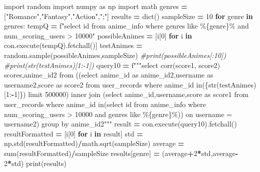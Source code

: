 \documentclass[
]{article}
\newenvironment{Shaded}{\begin{snugshade}}{\end{snugshade}}
\newcommand{\BuiltInTok}[1]{#1}
\newcommand{\CommentTok}[1]{\textcolor[rgb]{0.56,0.35,0.01}{\textit{#1}}}
\newcommand{\ControlFlowTok}[1]{\textcolor[rgb]{0.13,0.29,0.53}{\textbf{#1}}}
\newcommand{\DecValTok}[1]{\textcolor[rgb]{0.00,0.00,0.81}{#1}}
\newcommand{\ImportTok}[1]{#1}
\newcommand{\KeywordTok}[1]{\textcolor[rgb]{0.13,0.29,0.53}{\textbf{#1}}}
\newcommand{\NormalTok}[1]{#1}
\newcommand{\OperatorTok}[1]{\textcolor[rgb]{0.81,0.36,0.00}{\textbf{#1}}}
\newcommand{\SpecialCharTok}[1]{\textcolor[rgb]{0.00,0.00,0.00}{#1}}
\newcommand{\SpecialStringTok}[1]{\textcolor[rgb]{0.31,0.60,0.02}{#1}}
\newcommand{\StringTok}[1]{\textcolor[rgb]{0.31,0.60,0.02}{#1}}
\begin{document}
\begin{Shaded}
\begin{Highlighting}[]
\ImportTok{import}\NormalTok{ random}
\ImportTok{import}\NormalTok{ numpy }\ImportTok{as}\NormalTok{ np}
\ImportTok{import}\NormalTok{ math}
\NormalTok{genres }\OperatorTok{=}\NormalTok{ [}\StringTok{"Romance"}\NormalTok{,}\StringTok{"Fantasy"}\NormalTok{,}\StringTok{"Action"}\NormalTok{,}\StringTok{";"}\NormalTok{]}
\NormalTok{results }\OperatorTok{=} \BuiltInTok{dict}\NormalTok{()}
\NormalTok{sampleSize }\OperatorTok{=} \DecValTok{10}
\ControlFlowTok{for}\NormalTok{ genre }\KeywordTok{in}\NormalTok{ genres:}
\NormalTok{  tempQ }\OperatorTok{=} \SpecialStringTok{f"select id from anime\_info where genres like \textquotesingle{}\%}\SpecialCharTok{\{}\NormalTok{genre}\SpecialCharTok{\}}\SpecialStringTok{\%\textquotesingle{} and num\_scoring\_users \textgreater{} 10000"}
\NormalTok{  possibleAnimes }\OperatorTok{=}\NormalTok{ [i[}\DecValTok{0}\NormalTok{] }\ControlFlowTok{for}\NormalTok{ i }\KeywordTok{in}\NormalTok{ con.execute(tempQ).fetchall()]}
\NormalTok{  testAnimes }\OperatorTok{=}\NormalTok{ random.sample(possibleAnimes,sampleSize)}
  \CommentTok{\#print(possibleAnimes[:10])}
  \CommentTok{\#print(str(testAnimes)[1:{-}1])}
\NormalTok{  query10 }\OperatorTok{=} \SpecialStringTok{f"""select corr(score1, score2) scores,anime\_id2 from }
\SpecialStringTok{    ((select anime\_id as anime\_id2,username as username2,score as score2  from user\_records where anime\_id in(}\SpecialCharTok{\{}\BuiltInTok{str}\NormalTok{(testAnimes)[}\DecValTok{1}\NormalTok{:}\OperatorTok{{-}}\DecValTok{1}\NormalTok{]}\SpecialCharTok{\}}\SpecialStringTok{) limit 500000) }
\SpecialStringTok{    inner join  (select anime\_id,username,score as score1 from user\_records where anime\_id in(select id from anime\_info where num\_scoring\_users \textgreater{} 10000 and genres like \textquotesingle{}\%}\SpecialCharTok{\{}\NormalTok{genre}\SpecialCharTok{\}}\SpecialStringTok{\%\textquotesingle{}))}
\SpecialStringTok{    on  username = username2)  group by anime\_id2"""}
\NormalTok{  result }\OperatorTok{=}\NormalTok{ con.execute(query10).fetchall()}
\NormalTok{  resultFormatted }\OperatorTok{=}\NormalTok{ [i[}\DecValTok{0}\NormalTok{] }\ControlFlowTok{for}\NormalTok{ i }\KeywordTok{in}\NormalTok{ result]}
\NormalTok{  std }\OperatorTok{=}\NormalTok{ np.std(resultFormatted)}\OperatorTok{/}\NormalTok{math.sqrt(sampleSize)}
\NormalTok{  average }\OperatorTok{=} \BuiltInTok{sum}\NormalTok{(resultFormatted)}\OperatorTok{/}\NormalTok{sampleSize}
\NormalTok{  results[genre] }\OperatorTok{=}\NormalTok{ (average}\OperatorTok{+}\DecValTok{2}\OperatorTok{*}\NormalTok{std,average}\OperatorTok{{-}}\DecValTok{2}\OperatorTok{*}\NormalTok{std)}
\BuiltInTok{print}\NormalTok{(results)}
\end{Highlighting}
\end{Shaded}
\end{document}
